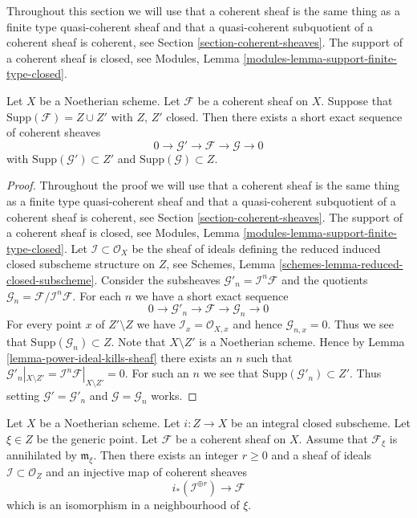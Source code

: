 \medskip\noindent
Throughout this section we will use that a coherent sheaf is the
same thing as a finite type quasi-coherent sheaf and that a
quasi-coherent subquotient of a coherent sheaf is coherent, see
Section \ref{section-coherent-sheaves}.
The support of a coherent sheaf is closed, see
Modules, Lemma \ref{modules-lemma-support-finite-type-closed}.

\begin{lemma}
\label{lemma-prepare-filter-support}
Let $X$ be a Noetherian scheme.
Let $\mathcal{F}$ be a coherent sheaf on $X$.
Suppose that $\text{Supp}(\mathcal{F}) = Z \cup Z'$ with $Z$, $Z'$ closed.
Then there exists a short exact sequence of coherent sheaves
$$
0 \to \mathcal{G}' \to \mathcal{F} \to \mathcal{G} \to 0
$$
with $\text{Supp}(\mathcal{G}') \subset Z'$ and
$\text{Supp}(\mathcal{G}) \subset Z$.
\end{lemma}

\begin{proof}
Throughout the proof we will use that a coherent sheaf is the
same thing as a finite type quasi-coherent sheaf and that a
quasi-coherent subquotient of a coherent sheaf is coherent, see
Section \ref{section-coherent-sheaves}.
The support of a coherent sheaf is closed, see
Modules, Lemma \ref{modules-lemma-support-finite-type-closed}.
Let $\mathcal{I} \subset \mathcal{O}_X$ be the sheaf of ideals
defining the reduced induced closed subscheme structure on $Z$, see
Schemes, Lemma \ref{schemes-lemma-reduced-closed-subscheme}.
Consider the subsheaves
$\mathcal{G}'_n = \mathcal{I}^n\mathcal{F}$ and the
quotients $\mathcal{G}_n = \mathcal{F}/\mathcal{I}^n\mathcal{F}$.
For each $n$ we have a short exact sequence
$$
0 \to \mathcal{G}'_n \to \mathcal{F} \to \mathcal{G}_n \to 0
$$
For every point $x$ of $Z' \setminus Z$ we have
$\mathcal{I}_x = \mathcal{O}_{X, x}$
and hence $\mathcal{G}_{n, x} = 0$. Thus we see that
$\text{Supp}(\mathcal{G}_n) \subset Z$. Note that $X \setminus Z'$
is a Noetherian scheme. Hence by Lemma \ref{lemma-power-ideal-kills-sheaf}
there exists an $n$ such that
$\mathcal{G}'_n|_{X \setminus Z'} =
\mathcal{I}^n\mathcal{F}|_{X \setminus Z'} = 0$.
For such an $n$ we see that $\text{Supp}(\mathcal{G}'_n) \subset Z'$.
Thus setting
$\mathcal{G}' = \mathcal{G}'_n$ and $\mathcal{G} = \mathcal{G}_n$
works.
\end{proof}

\begin{lemma}
\label{lemma-prepare-filter-irreducible}
Let $X$ be a Noetherian scheme.
Let $i : Z \to X$ be an integral closed subscheme.
Let $\xi \in Z$ be the generic point.
Let $\mathcal{F}$ be a coherent sheaf on $X$.
Assume that $\mathcal{F}_\xi$ is annihilated by
$\mathfrak m_\xi$. Then there exists an integer
$r \geq 0$ and a sheaf of ideals $\mathcal{I} \subset \mathcal{O}_Z$
and an injective map of coherent sheaves
$$
i_*\left(\mathcal{I}^{\oplus r}\right) \to \mathcal{F}
$$
which is an isomorphism in a neighbourhood of $\xi$.
\end{lemma}

